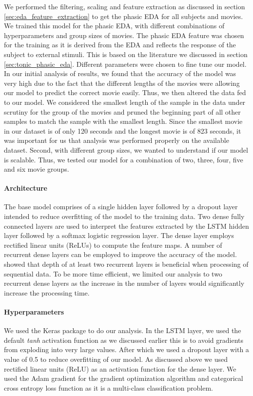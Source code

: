 We performed the filtering, scaling and feature extraction as discussed in section \ref{sec:eda_feature_extraction} to get the phasic EDA for all subjects and movies. We trained this model for the phasic EDA, with different combinations of hyperparameters and group sizes of movies. The phasic EDA feature was chosen for the training as it is derived from the EDA and reflects the response of the subject to external stimuli. This is based on the literature we discussed in section \ref{sec:tonic_phasic_eda}. Different parameters were chosen to fine tune our model. In our initial analysis of results, we found that the accuracy of the model was very high due to the fact that the different lengths of the movies were allowing our model to predict the correct movie easily. Thus, we then altered the data fed to our model. We considered the smallest length of the sample in the data under scrutiny for the group of the movies and pruned the beginning part of all other samples to match the sample with the smallest length. Since the smallest movie in our dataset is of only 120 seconds and the longest movie is of 823 seconds, it was important for us that analysis was performed properly on the available dataset. Second, with different group sizes, we wanted to understand if our model is scalable. Thus, we tested our model for a combination of two, three, four, five and six movie groups. 

\paragraph{Architecture} The base model comprises of a single hidden layer followed by a dropout layer intended to reduce overfitting of the model to the training data. Two dense fully connected layers are used to interpret the features extracted by the LSTM hidden layer followed by a softmax logistic regression layer. The dense layer employs rectified linear units (ReLUs) to compute the feature maps. A number of recurrent dense layers can be employed to improve the accuracy of the model. \citeauthor{karpathy_visualizing_2015} \cite{karpathy_visualizing_2015} showed that depth of at least two recurrent layers is beneficial when processing of sequential data. To be more time efficient, we limited our analysis to two recurrent dense layers as the increase in the number of layers would significantly increase the processing time. 

\paragraph{Hyperparameters} We used the Keras \cite{keras} package to do our analysis. In the LSTM layer, we used the default \textit{tanh} activation function as we discussed earlier this is to avoid gradients from exploding into very large values. After which we used a dropout layer with a value of 0.5 to reduce overfitting of our model. As discussed above we used rectified linear units (ReLU) as an activation function for the dense layer. We used the Adam gradient \cite{kingma_adam:_2014} for the gradient optimization algorithm and categorical cross entropy loss function as it is a multi-class classification problem. 

